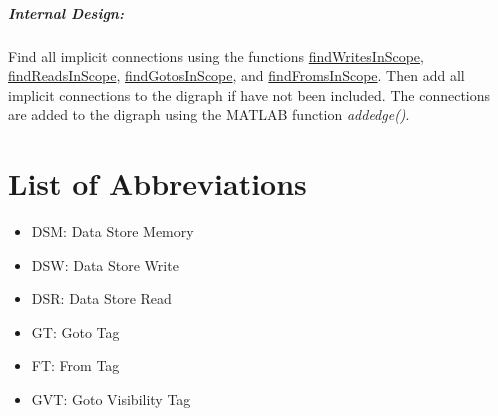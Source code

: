 \documentclass[12pt,letterpaper]{report}
\begin{document}
\paragraph{Internal Design:} Find all implicit connections using the functions \hyperref[findWritesInScope]{findWritesInScope}, \hyperref[findReadsInScope]{findReadsInScope}, \hyperref[findGotosInScope]{findGotosInScope}, and \hyperref[findFromsInScope]{findFromsInScope}. Then add all implicit connections to the digraph if have not been included. The connections are added to the digraph using the MATLAB function \textit{addedge()}.

\clearpage

\appendix
\chapter{List of Abbreviations} \label{A}
\begin{itemize}
	\item DSM: Data Store Memory
	\item DSW: Data Store Write
	\item DSR: Data Store Read
	\item GT: Goto Tag
	\item FT: From Tag
	\item GVT: Goto Visibility Tag
\end{itemize}
\end{document}
